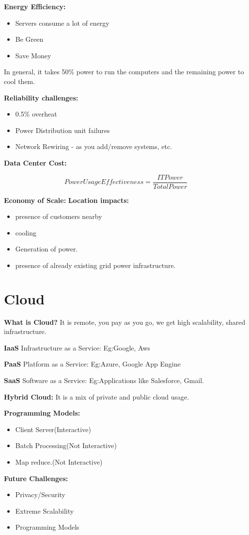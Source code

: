\documentclass[twoside]{article}
\begin{document}
\textbf{Energy Efficiency:} 
\begin{itemize}
  \item Servers consume a lot of energy
  \item Be Green
  \item Save Money
\end{itemize}

In general, it takes 50\% power to run the computers and the remaining power to cool them.
 
 \textbf{Reliability challenges:} 
 \begin{itemize}
  \item 0.5\% overheat
  \item Power Distribution unit failures 
  \item Network Rewiring - as you add/remove systems, etc.
\end{itemize}

 
 \textbf{Data Center Cost:} 
 
 $${Power Usage Effectiveness} =\frac{{IT Power}}{{Total Power}}$$

 \textbf{Economy of Scale:} 
 \textbf{Location impacts:} 
 \begin{itemize}
  \item presence of customers nearby
  \item cooling
  \item Generation of power.
  \item presence of already existing grid power infrastructure.
\end{itemize}


\section{Cloud}
\textbf{What is Cloud?} It is remote, you pay as you go, we get high scalability, shared infrastructure.

\textbf{IaaS} Infrastructure as a Service: Eg:Google, Aws

\textbf{PaaS} Platform as a Service: Eg:Azure, Google App Engine

\textbf{SaaS} Software as a Service: Eg:Applications like Salesforce, Gmail.

\textbf{Hybrid Cloud:} It is a mix of private and public cloud usage.

\textbf{Programming Models:}
 \begin{itemize}
  \item Client Server(Interactive)
  \item Batch Processing(Not Interactive)
  \item Map reduce.(Not Interactive)
\end{itemize}


\textbf{Future Challenges:}
 \begin{itemize}
  \item Privacy/Security
  \item Extreme Scalability
  \item Programming Models
\end{itemize}
\end{document}
